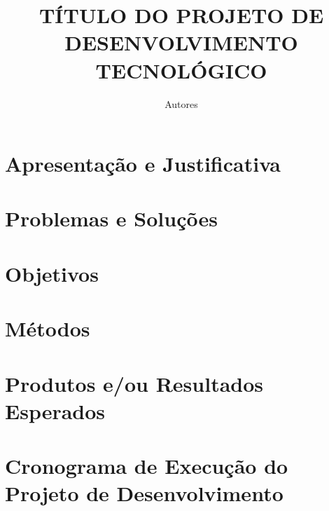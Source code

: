 \documentclass{projectUESPI}
\title{\color{red}TÍTULO DO PROJETO DE DESENVOLVIMENTO TECNOLÓGICO\color{black}}
\author{\color{red}Autores\color{black}}
\begin{document}
\maketitle
\newpage
\tableofcontents
\thispagestyle{empty}
\newpage
\setcounter{page}{1}

\section{Apresentação e Justificativa}

\newpage

\section{Problemas e Soluções}

\newpage 


\section{Objetivos}

\newpage

\section{Métodos}

\newpage

\section{Produtos e/ou Resultados Esperados}

\newpage

\section{Cronograma de Execução do Projeto de Desenvolvimento}

\newpage



\newpage
\end{document}
